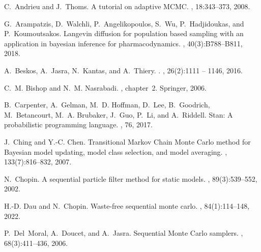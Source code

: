 \documentclass[12pt]{article}
\begin{document}
\begin{thebibliography}{10}

    C.~Andrieu and J.~Thoms.
    \newblock A tutorial on adaptive {MCMC}.
    , 18:343--373, 2008.
    
    G.~Arampatzis, D.~Walchli, P.~Angelikopoulos, S.~Wu, P.~Hadjidoukas, and
      P.~Koumoutsakos.
    \newblock Langevin diffusion for population based sampling with an application
      in bayesian inference for pharmacodynamics.
    , 40(3):B788--B811, 2018.
    
    A.~Beskos, A.~Jasra, N.~Kantas, and A.~Thiery.
    .
    , 26(2):1111 -- 1146, 2016.
    
    C.~M. Bishop and N.~M. Nasrabadi.
    , chapter~2.
    \newblock Springer, 2006.
    
    B.~Carpenter, A.~Gelman, M.~D. Hoffman, D.~Lee, B.~Goodrich, M.~Betancourt,
      M.~A. Brubaker, J.~Guo, P.~Li, and A.~Riddell.
    \newblock Stan: A probabilistic programming language.
    , 76, 2017.
    
    J.~Ching and Y.-C. Chen.
    \newblock Transitional {M}arkov {C}hain {M}onte {C}arlo method for {B}ayesian
      model updating, model class selection, and model averaging.
    , 133(7):816--832, 2007.
    
    N.~Chopin.
    \newblock A sequential particle filter method for static models.
    , 89(3):539--552, 2002.
    
    H.-D. Dau and N.~Chopin.
    \newblock Waste-free sequential monte carlo.
    , 84(1):114--148, 2022.
    
    P.~Del~Moral, A.~Doucet, and A.~Jasra.
    \newblock Sequential {M}onte {C}arlo samplers.
    , 68(3):411--436, 2006.
    

\end{thebibliography}
\end{document}
